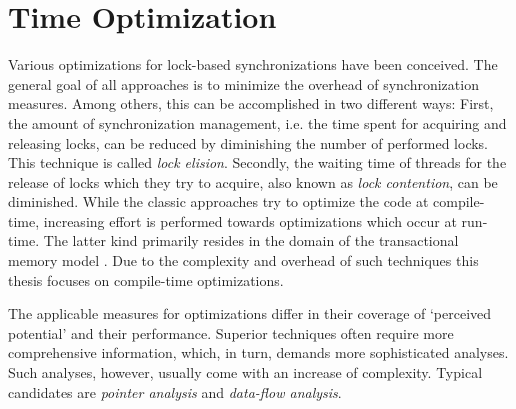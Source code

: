\section{Time Optimization}
Various optimizations for lock-based synchronizations have been conceived. The general goal of all approaches is to minimize the overhead of synchronization measures. Among others, this can be accomplished in two different ways: First, the amount of synchronization management, i.e. the time spent for acquiring and releasing locks, can be reduced by diminishing the number of performed locks. This technique is called \textit{lock elision}. Secondly, the waiting time of threads for the release of locks which they try to acquire, also known as \textit{lock contention}, can be diminished. While the classic approaches try to optimize the code at compile-time, increasing effort is performed towards optimizations which occur at run-time. The latter kind primarily resides in the domain of the transactional memory model \cite{SpeculativeLockElision}\cite{ARuntimeSystem}. Due to the complexity and overhead of such techniques this thesis focuses on compile-time optimizations.

The applicable measures for optimizations differ in their coverage of `perceived potential' and their performance. Superior techniques often require more comprehensive information, which, in turn, demands more sophisticated analyses. Such analyses, however, usually come with an increase of complexity. Typical candidates are \textit{pointer analysis} and \textit{data-flow analysis}.

